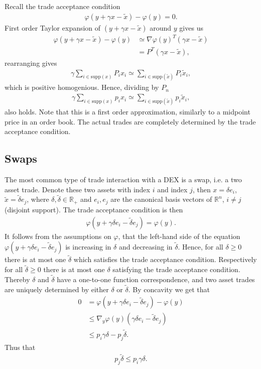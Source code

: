Recall the trade acceptance condition
\begin{align}
    \varphi(y + \gamma x - \tilde{x}) - \varphi(y) = 0.
\end{align}
First order Taylor expansion of $(y + \gamma x - \tilde{x})$ around $y$ gives us
\begin{align}
    \varphi(y + \gamma x - \tilde{x}) - \varphi(y) &\simeq \nabla
    \varphi(y)^{T} (\gamma x - \tilde{x}) \\
                   &=P^{T} (\gamma x - \tilde{x}),
\end{align}
rearranging gives
\begin{align}
    \gamma \sum_{i \in \text{supp}(x) } P_i x_i \simeq \sum_{i \in
    \text{supp}(\tilde{x}) } P_i \tilde{x}_i,
\end{align}
which is positive homogenious. Hence, dividing by $P_n$
\begin{align}
    \gamma \sum_{i \in \text{supp}(x) } p_i x_i \simeq \sum_{i \in
    \text{supp}(\tilde{x}) } p_i \tilde{x}_i,
\end{align}
also holds.
Note that this is a first order approximation, similarly to a
midpoint price in an order book. The actual trades are completely
determined by the trade acceptance condition.
\subsection{Swaps}
The most common type of trade interaction with a DEX is a swap, i.e. a two
asset trade. Denote these two assets with index $i$ and index $j$, then
$x=\delta e_i$, $\tilde{x}=\tilde{\delta} e_j$, where $\delta, \tilde{\delta}
\in \mathbb{R}_+$ and $e_i,e_j$ are the canonical basis vectors of
$\mathbb{R}^{n}$, $i \neq j$ (disjoint support). The trade acceptance
condition is then
\begin{align}
    \varphi(y + \gamma\delta e_i - \tilde{\delta}e_j) = \varphi(y).
    \label{eq: trade_acceptance_condition}
\end{align}
It follows from the assumptions on $\varphi$, that the left-hand side of the
equation $\varphi(y + \gamma\delta e_i - \tilde{\delta}e_j)$ is increasing
in $\delta$ and decreasing in $\tilde{\delta}$. Hence, for all $\delta \ge 0$
there is at most one $\tilde{\delta}$ which satisfies the trade acceptance
condition. Respectively for all $\tilde{\delta} \ge 0$ there is at most one
$\delta$ satisfying the trade acceptance condition. Thereby $\delta$ and
$\tilde{\delta}$ have a one-to-one function correspondence, and two asset
trades are uniquely determined by either $\delta$ or $\tilde{\delta}$. By
concavity we get that
\begin{align}
    0 &= \varphi(y+\gamma\delta e_i - \tilde{\delta}e_j) - \varphi(y)\\
      &\le \nabla_y \varphi(y) (\gamma\delta e_i - \tilde{\delta}e_j) \\
      &\le p_i \gamma \delta - p_j \tilde{\delta}.
\end{align}
Thus that
\begin{align}
    p_j \tilde{\delta} \le p_i \gamma \delta.
\end{align}

